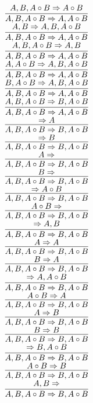 \documentclass[11pt]{article}
\begin{document}
\begin{center}
\bigskip
\\$\infer{A, B, A\circ B\Rightarrow A, A\circ B}{A, B, A\circ B\Rightarrow A\circ B}$
\bigskip
\\$\infer{A, B, A\circ B\Rightarrow A, A\circ B}{A, B\Rightarrow A, B, A\circ B}$
\bigskip
\\$\infer{A, B, A\circ B\Rightarrow A, A\circ B}{A, B, A\circ B\Rightarrow A, B}$
\bigskip
\\$\infer{A, B, A\circ B\Rightarrow A, A\circ B}{A, A\circ B\Rightarrow A, B, A\circ B}$
\bigskip
\\$\infer{A, B, A\circ B\Rightarrow A, A\circ B}{B, A\circ B\Rightarrow A, B, A\circ B}$
\bigskip
\\$\infer{A, B, A\circ B\Rightarrow A, A\circ B}{A, B, A\circ B\Rightarrow B, A\circ B}$
\bigskip
\\$\infer{A, B, A\circ B\Rightarrow B, A\circ B}{\Rightarrow A}$
\bigskip
\\$\infer{A, B, A\circ B\Rightarrow B, A\circ B}{\Rightarrow B}$
\bigskip
\\$\infer{A, B, A\circ B\Rightarrow B, A\circ B}{A\Rightarrow }$
\bigskip
\\$\infer{A, B, A\circ B\Rightarrow B, A\circ B}{B\Rightarrow }$
\bigskip
\\$\infer{A, B, A\circ B\Rightarrow B, A\circ B}{\Rightarrow A\circ B}$
\bigskip
\\$\infer{A, B, A\circ B\Rightarrow B, A\circ B}{A\circ B\Rightarrow }$
\bigskip
\\$\infer{A, B, A\circ B\Rightarrow B, A\circ B}{\Rightarrow A, B}$
\bigskip
\\$\infer{A, B, A\circ B\Rightarrow B, A\circ B}{A\Rightarrow A}$
\bigskip
\\$\infer{A, B, A\circ B\Rightarrow B, A\circ B}{B\Rightarrow A}$
\bigskip
\\$\infer{A, B, A\circ B\Rightarrow B, A\circ B}{\Rightarrow A, A\circ B}$
\bigskip
\\$\infer{A, B, A\circ B\Rightarrow B, A\circ B}{A\circ B\Rightarrow A}$
\bigskip
\\$\infer{A, B, A\circ B\Rightarrow B, A\circ B}{A\Rightarrow B}$
\bigskip
\\$\infer{A, B, A\circ B\Rightarrow B, A\circ B}{B\Rightarrow B}$
\bigskip
\\$\infer{A, B, A\circ B\Rightarrow B, A\circ B}{\Rightarrow B, A\circ B}$
\bigskip
\\$\infer{A, B, A\circ B\Rightarrow B, A\circ B}{A\circ B\Rightarrow B}$
\bigskip
\\$\infer{A, B, A\circ B\Rightarrow B, A\circ B}{A, B\Rightarrow }$

\end{center}
\end{document}

